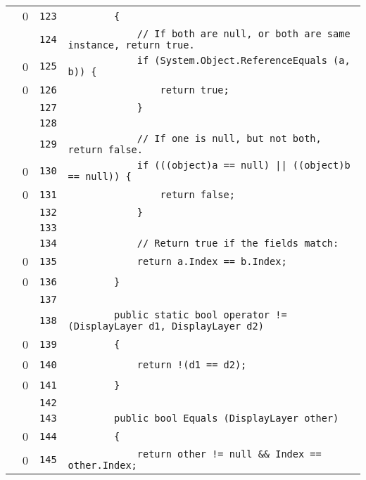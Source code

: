 \documentclass[a4paper,10pt]{article}
\begin{document}
\begin{longtable}[l]{lrrl}
\cellcolor{red} & 0 & \verb~123~ & \verb~        {~\\
\cellcolor{gray} &  & \verb~124~ & \verb~            // If both are null, or both are same instance, return true.~\\
\cellcolor{red} & 0 & \verb~125~ & \verb~            if (System.Object.ReferenceEquals (a, b)) {~\\
\cellcolor{red} & 0 & \verb~126~ & \verb~                return true;~\\
\cellcolor{gray} &  & \verb~127~ & \verb~            }~\\
\cellcolor{gray} &  & \verb~128~ & \verb~~\\
\cellcolor{gray} &  & \verb~129~ & \verb~            // If one is null, but not both, return false.~\\
\cellcolor{red} & 0 & \verb~130~ & \verb~            if (((object)a == null) || ((object)b == null)) {~\\
\cellcolor{red} & 0 & \verb~131~ & \verb~                return false;~\\
\cellcolor{gray} &  & \verb~132~ & \verb~            }~\\
\cellcolor{gray} &  & \verb~133~ & \verb~~\\
\cellcolor{gray} &  & \verb~134~ & \verb~            // Return true if the fields match:~\\
\cellcolor{red} & 0 & \verb~135~ & \verb~            return a.Index == b.Index;~\\
\cellcolor{red} & 0 & \verb~136~ & \verb~        }~\\
\cellcolor{gray} &  & \verb~137~ & \verb~~\\
\cellcolor{gray} &  & \verb~138~ & \verb~        public static bool operator != (DisplayLayer d1, DisplayLayer d2)~\\
\cellcolor{red} & 0 & \verb~139~ & \verb~        {~\\
\cellcolor{red} & 0 & \verb~140~ & \verb~            return !(d1 == d2);~\\
\cellcolor{red} & 0 & \verb~141~ & \verb~        }~\\
\cellcolor{gray} &  & \verb~142~ & \verb~~\\
\cellcolor{gray} &  & \verb~143~ & \verb~        public bool Equals (DisplayLayer other)~\\
\cellcolor{red} & 0 & \verb~144~ & \verb~        {~\\
\cellcolor{red} & 0 & \verb~145~ & \verb~            return other != null && Index == other.Index;~\\

\end{longtable}
\end{document}
